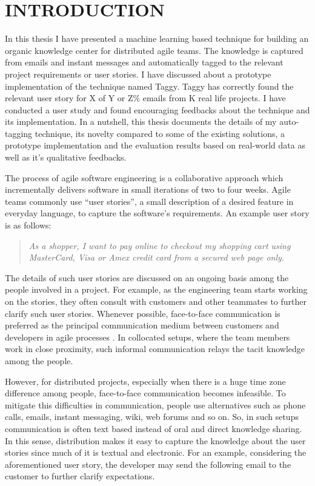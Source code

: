 \fancyhead[RO,LE]{\thepage}
\fancyfoot{} 
\chapter{INTRODUCTION}
In this thesis I have presented a machine learning based technique for building an organic knowledge center for distributed agile teams. The knowledge is captured from emails and instant messages and automatically tagged to the relevant project requirements or user stories. I have discussed about a prototype implementation of the technique named Taggy. Taggy has correctly found the relevant user story for X of Y or Z\% emails from K real life projects. I have conducted a user study and found encouraging feedbacks about the technique and its implementation. In a nutshell, this thesis documents the details of my auto-tagging technique, its novelty compared to some of the existing solutions, a prototype implementation and the evaluation results based on real-world data as well as it's qualitative feedbacks.

The process of agile software engineering is a collaborative approach which incrementally delivers software in small iterations of two to four weeks. Agile teams commonly use ``user stories'', a small description of a desired feature in everyday language, to capture the software's requirements. An example user story is as follows:\\
\begin{quote}
\emph{As a shopper, I want to pay online to checkout my shopping cart using MasterCard, Visa or Amex credit card from a secured web page only.}\\
\end{quote}
The details of such user stories are discussed on an ongoing basis among the people involved in a project. For example, as the engineering team starts working on the stories, they often consult with customers and other teammates to further clarify such user stories. Whenever possible, face-to-face communication is preferred as the principal communication medium between customers and developers in agile processes \cite{am} \cite{xp} \cite{scrum} \cite{xp_up}. In collocated setups, where the team members work in close proximity, such informal communication relays the tacit knowledge among the people. 

However, for distributed projects, especially when there is a huge time zone difference among people, face-to-face communication becomes infeasible. To mitigate this difficulties in communication, people use alternatives such as phone calls, emails, instant messaging, wiki, web forums and so on. So, in such setups communication is often text based instead of oral and direct knowledge sharing. In this sense, distribution makes it easy to capture the knowledge about the user stories since much of it is textual and electronic. For an example, considering the aforementioned user story, the developer may send the following email to the customer to further clarify expectations.\\

